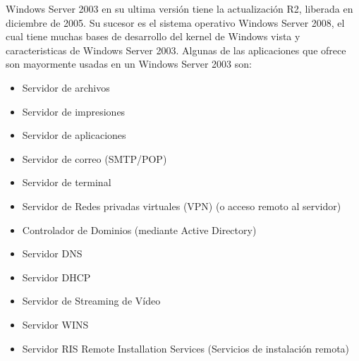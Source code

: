 \documentclass[paper=a4, fontsize=12pt]{article} 		%
\numberwithin{equation}{section}						%
\numberwithin{table}{section} 							%
\begin{document}
Windows Server 2003 en su ultima versión tiene la actualización R2, liberada en diciembre de 2005. Su sucesor es el sistema operativo Windows Server 2008, el cual tiene muchas bases de desarrollo del kernel de Windows vista y caracteristicas de Windows Server 2003.
Algunas de las aplicaciones que ofrece son mayormente usadas en un Windows Server 2003 son: 
\begin{itemize}
  \item Servidor de archivos
  \item Servidor de impresiones
  \item Servidor de aplicaciones
  \item Servidor de correo (SMTP/POP)
  \item Servidor de terminal
  \item Servidor de Redes privadas virtuales (VPN) (o acceso remoto al servidor)
  \item Controlador de Dominios (mediante Active Directory)
  \item Servidor DNS
  \item Servidor DHCP
  \item Servidor de Streaming de Vídeo
  \item Servidor WINS
  \item Servidor RIS Remote Installation Services (Servicios de instalación remota)
\end{itemize}
\end{document}
